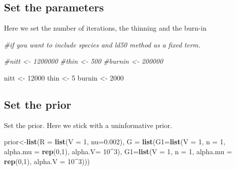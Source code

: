 \documentclass[]{article}
\newenvironment{Shaded}{\begin{snugshade}}{\end{snugshade}}
\newcommand{\KeywordTok}[1]{\textcolor[rgb]{0.13,0.29,0.53}{\textbf{#1}}}
\newcommand{\DataTypeTok}[1]{\textcolor[rgb]{0.13,0.29,0.53}{#1}}
\newcommand{\DecValTok}[1]{\textcolor[rgb]{0.00,0.00,0.81}{#1}}
\newcommand{\FloatTok}[1]{\textcolor[rgb]{0.00,0.00,0.81}{#1}}
\newcommand{\StringTok}[1]{\textcolor[rgb]{0.31,0.60,0.02}{#1}}
\newcommand{\CommentTok}[1]{\textcolor[rgb]{0.56,0.35,0.01}{\textit{#1}}}
\newcommand{\OperatorTok}[1]{\textcolor[rgb]{0.81,0.36,0.00}{\textbf{#1}}}
\newcommand{\NormalTok}[1]{#1}
\begin{document}
\subsection{Set the parameters}\label{set-the-parameters}

Here we set the number of iterations, the thinning and the burn-in

\begin{Shaded}
\begin{Highlighting}[]
\CommentTok{#if you want to include species and ld50 method as a fixed term.}

\CommentTok{#nitt <- 1200000}
\CommentTok{#thin <- 500}
\CommentTok{#burnin <- 200000}

\NormalTok{nitt <-}\StringTok{ }\DecValTok{12000}
\NormalTok{thin <-}\StringTok{ }\DecValTok{5}
\NormalTok{burnin <-}\StringTok{ }\DecValTok{2000}
\end{Highlighting}
\end{Shaded}

\subsection{Set the prior}\label{set-the-prior}

Set the prior. Here we stick with a uninformative prior.

\begin{Shaded}
\begin{Highlighting}[]
\NormalTok{prior<-}\KeywordTok{list}\NormalTok{(}\DataTypeTok{R =} \KeywordTok{list}\NormalTok{(}\DataTypeTok{V =} \DecValTok{1}\NormalTok{, }\DataTypeTok{nu=}\FloatTok{0.002}\NormalTok{), }
            \DataTypeTok{G =} \KeywordTok{list}\NormalTok{(}\DataTypeTok{G1=}\KeywordTok{list}\NormalTok{(}\DataTypeTok{V =} \DecValTok{1}\NormalTok{,}
                             \DataTypeTok{n =} \DecValTok{1}\NormalTok{, }
                             \DataTypeTok{alpha.mu =} \KeywordTok{rep}\NormalTok{(}\DecValTok{0}\NormalTok{,}\DecValTok{1}\NormalTok{),}
                             \DataTypeTok{alpha.V=} \DecValTok{10}\OperatorTok{^}\DecValTok{3}\NormalTok{), }
                     \DataTypeTok{G1=}\KeywordTok{list}\NormalTok{(}\DataTypeTok{V =} \DecValTok{1}\NormalTok{,}
                             \DataTypeTok{n =} \DecValTok{1}\NormalTok{, }
                             \DataTypeTok{alpha.mu =} \KeywordTok{rep}\NormalTok{(}\DecValTok{0}\NormalTok{,}\DecValTok{1}\NormalTok{), }
                             \DataTypeTok{alpha.V =} \DecValTok{10}\OperatorTok{^}\DecValTok{3}\NormalTok{)))}
\end{Highlighting}
\end{Shaded}
\end{document}

